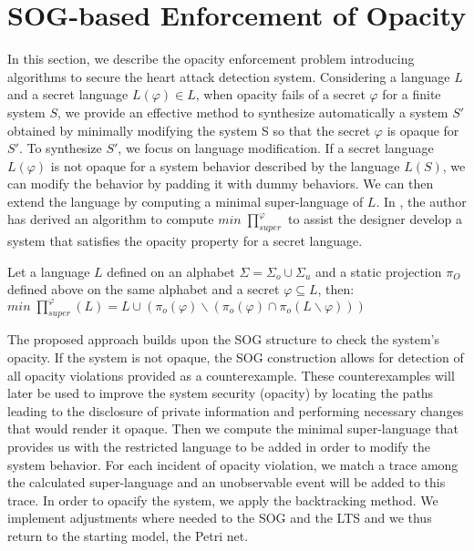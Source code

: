 \section{SOG-based Enforcement of Opacity}
In this section, we describe the opacity enforcement problem introducing algorithms to secure the heart attack detection system. Considering a language $L$ and a secret language $L(\varphi) \in L$, when opacity fails of a secret $\varphi$ for a finite system $S$, we provide an effective method to synthesize automatically a system $S'$ obtained by minimally modifying the system S so that the secret $\varphi$  is opaque for $S'$. To synthesize $S'$, we focus on language modification. If a secret language $L(\varphi)$ is not opaque for a system behavior described by the language $L(S)$, we can modify the behavior by padding it with dummy behaviors. We can then extend the language by computing a minimal super-language of $L$. In \cite{Yeddes16}, the author has derived an algorithm to compute $min \; \prod_{super}^\varphi$ to assist the designer develop a system that satisfies the opacity property for a secret language.
\begin{theorem} \cite{Yeddes16}
	\label{theorem:minimal}
	Let a language $L$ defined on an alphabet $\Sigma = \Sigma_{o} \cup \Sigma_{u} $ and a static projection $\pi_O$ defined above on the same alphabet and a secret $\varphi \subseteq L$, then:
	\centering $min\; \prod_{super}^\varphi(L) = L \cup (\pi_o(\varphi) \backslash (\pi_o(\varphi)\cap \pi_o(L \backslash \varphi)))$	
\end{theorem}

The proposed approach builds upon the SOG structure to check the system's opacity. If the system is not opaque, the SOG construction allows for detection of all opacity violations provided as a counterexample. These counterexamples will later be used to improve the system security (opacity) by locating the paths leading to the disclosure of private information and performing necessary changes that would render it opaque. 
Then we compute the minimal super-language that provides us with the restricted language to be added in order to modify the system behavior. For each incident of opacity violation, we match a trace among the calculated super-language and an unobservable event will be added to this trace. In order to opacify the system, we apply the backtracking method. We implement adjustments where needed to the SOG and the LTS and we thus return to the starting model, the Petri net. 

